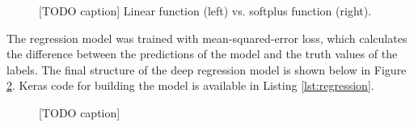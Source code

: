 \begin{figure}[h]
    \centering
    \caption{[TODO caption] Linear function (left) vs. softplus function (right).}
    \label{fig:sigmoid}
\end{figure}

The regression model was trained with mean-squared-error loss, which calculates the difference between the predictions of the model and the truth values of the labels. The final structure of the deep regression model is shown below in Figure \ref{fig:regression_details}. Keras code for building the model is available in Listing \ref{lst:regression}.

\begin{figure}[h]
    \centering
    \caption{[TODO caption]}
    \label{fig:regression_details}
\end{figure}
